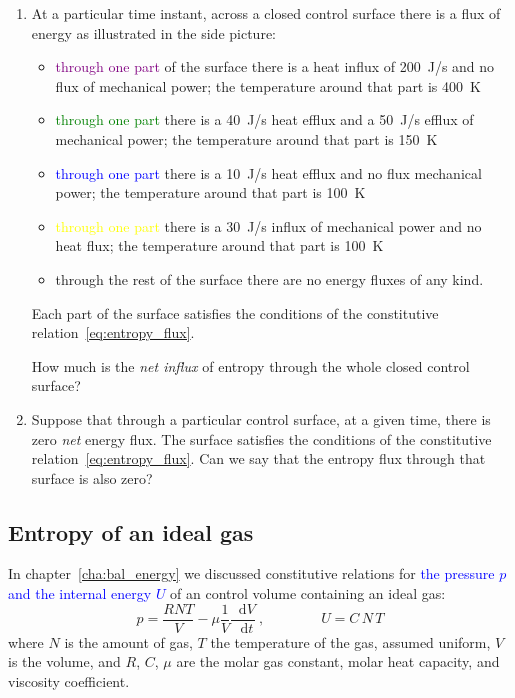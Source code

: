 \documentclass[a4paper,12pt,%
onecolumn,oneside,%
british%
]{memoir}
\newcommand*{\di}{\mathop{}\!\mathrm{d}}%
\renewcommand*{\|}[1][]{\nonscript\:#1\vert\nonscript\:\mathopen{}}
\newcommand*{\sect}{\S}%
\newcommand*{\chap}{chapter}%
\renewcommand*{\autoref}[3][\sect\,\ref]{\textcolor{blue}{#3}
\raisebox{0.6ex}{\color{blue}\miniscule%
\faIcon{angle-right}%
\;#1{#2}\;p.\,\pageref{#2}}}
\newcommand*{\yvis}{\mu} %
\newcommand*{\dt}{\di t}
\newcommand*{\yN}{N}
\newcommand*{\yU}{U}
\newcommand*{\ypr}{p} %
\newcommand*{\yT}{T}%
\begin{document}
\begin{exercise}
  \begin{enumerate}[exerc]
  \item At a particular time instant, across a closed control surface there is a flux of energy as illustrated in the side picture:
    \begin{itemize}
    \item \textcolor{purple}{through one part} of the surface there is a heat influx of \qty{200}{J/s} and no flux of mechanical power; the temperature around that part is \qty{400}{K}
    \item \textcolor{green}{through one part} there is a \qty{40}{J/s} heat efflux and a \qty{50}{J/s} efflux of mechanical power; the temperature around that part is \qty{150}{K}
    \item \textcolor{blue}{through one part} there is a  \qty{10}{J/s} heat efflux and no flux mechanical power; the temperature around that part is \qty{100}{K}
    \item \textcolor{yellow}{through one part}  there is a  \qty{30}{J/s} influx of mechanical power and no heat flux; the temperature around that part is \qty{100}{K}
    \item \textcolor{midgrey}{through the rest} of the surface there are no energy fluxes of any kind.
    \end{itemize}
    Each part of the surface satisfies the conditions of the constitutive relation~\eqref{eq:entropy_flux}.

    \smallskip

    How much is the \emph{net influx} of entropy through the whole closed control surface?

    \bigskip

  \item Suppose that through a particular control surface, at a given time, there is zero \emph{net} energy flux. The surface satisfies the conditions of the constitutive relation~\eqref{eq:entropy_flux}. Can we say that the entropy flux through that surface is also zero?
  \end{enumerate}
\end{exercise}

\subsection{Entropy of an ideal gas}
\label{sec:entropy_ideal_gas}

In \chap~\ref{cha:bal_energy} we discussed constitutive relations for \autoref{sec:int_energy_idealgas}{the pressure $\ypr$ and the internal energy $\yU$} of an control volume containing an ideal gas:
\begin{equation*}
  \ypr = \frac{R \yN \yT}{V}  - \yvis \frac{1}{V}\frac{\di V}{\dt} \ ,
  \qquad\qquad
  \yU = C\,\yN\,\yT
\end{equation*}
where $\yN$ is the amount of gas, $\yT$ the temperature of the gas, assumed uniform, $V$ is the volume, and $R$, $C$, $\yvis$ are the molar gas constant, molar heat capacity, and viscosity coefficient.
\end{document}
